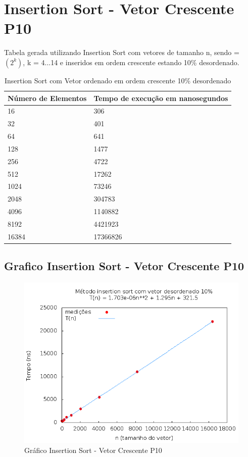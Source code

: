 \documentclass[12pt,a4paper,twoside]{report}
\begin{document}
\section{Insertion Sort - Vetor Crescente P10}
Tabela gerada utilizando Insertion Sort com vetores de tamanho n, sendo = $(2^k)$, k = 4...14 e inseridos em ordem crescente estando 10\% desordenado.

\begin{table}[H]
\centering
\caption{Insertion Sort com Vetor ordenado em ordem crescente 10\% desordenado}
\label{my-label}
\begin{tabular}{|l|l|}
\hline
\multicolumn{1}{|c|}{\textbf{Número de Elementos}} & \multicolumn{1}{c|}{\textbf{Tempo de execução em nanosegundos}} \\ \hline
16 & 306 \\ \hline
32 & 401 \\ \hline
64 & 641 \\ \hline
128 & 1477 \\ \hline
256 & 4722 \\ \hline
512 & 17262 \\ \hline
1024 & 73246 \\ \hline
2048 & 304783 \\ \hline
4096 & 1140882 \\ \hline
8192 & 4421923 \\ \hline
16384 & 17366826 \\ \hline
\end{tabular}
\end{table}

\subsection{Grafico Insertion Sort - Vetor Crescente P10}
\begin{figure}[H]
    \centering
    \includegraphics[width=0.7\linewidth]{graficos/Insertion/vIntCrescenteP10/vIntCrescenteP10.png}
  \caption{Gráfico Insertion Sort - Vetor Crescente P10}
\end{figure}
\end{document}
